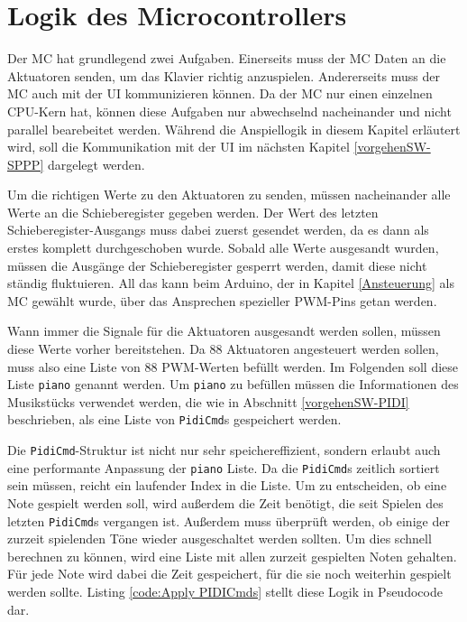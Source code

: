 \section{Logik des Microcontrollers} \label{vorgehenSW-MC}

Der \ac{MC} hat grundlegend zwei Aufgaben.
Einerseits muss der \ac{MC} Daten an die Aktuatoren senden, um das Klavier richtig anzuspielen.
Andererseits muss der \ac{MC} auch mit der \ac{UI} kommunizieren können.
Da der \ac{MC} nur einen einzelnen CPU-Kern hat, können diese Aufgaben nur abwechselnd nacheinander und nicht parallel bearebeitet werden.
Während die Anspiellogik in diesem Kapitel erläutert wird, soll die Kommunikation mit der \ac{UI} im nächsten Kapitel \ref{vorgehenSW-SPPP} dargelegt werden.

Um die richtigen Werte zu den Aktuatoren zu senden, müssen nacheinander alle Werte an die Schieberegister gegeben werden.
Der Wert des letzten Schieberegister-Ausgangs muss dabei zuerst gesendet werden, da es dann als erstes komplett durchgeschoben wurde.
Sobald alle Werte ausgesandt wurden, müssen die Ausgänge der Schieberegister gesperrt werden, damit diese nicht ständig fluktuieren.
All das kann beim Arduino, der in Kapitel \ref{Ansteuerung} als \ac{MC} gewählt wurde, über das Ansprechen spezieller \ac{PWM}-Pins getan werden.

Wann immer die Signale für die Aktuatoren ausgesandt werden sollen, müssen diese Werte vorher bereitstehen.
Da 88 Aktuatoren angesteuert werden sollen, muss also eine Liste von 88 \ac{PWM}-Werten befüllt werden.
Im Folgenden soll diese Liste \lstinline{piano} genannt werden.
Um \lstinline{piano} zu befüllen müssen die Informationen des Musikstücks verwendet werden, die wie in Abschnitt \ref{vorgehenSW-PIDI} beschrieben, als eine Liste von \lstinline{PidiCmd}s gespeichert werden.

Die \lstinline{PidiCmd}-Struktur ist nicht nur sehr speichereffizient, sondern erlaubt auch eine performante Anpassung der \lstinline{piano} Liste.
Da die \lstinline{PidiCmd}s zeitlich sortiert sein müssen, reicht ein laufender Index in die Liste.
Um zu entscheiden, ob eine Note gespielt werden soll, wird außerdem die Zeit benötigt, die seit Spielen des letzten \lstinline{PidiCmd}s vergangen ist.
Außerdem muss überprüft werden, ob einige der zurzeit spielenden Töne wieder ausgeschaltet werden sollten.
Um dies schnell berechnen zu können, wird eine Liste mit allen zurzeit gespielten Noten gehalten.
Für jede Note wird dabei die Zeit gespeichert, für die sie noch weiterhin gespielt werden sollte.
Listing \ref{code:Apply PIDICmds} stellt diese Logik in Pseudocode dar.

